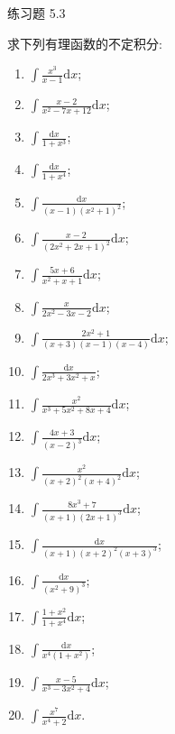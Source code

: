 \begin{exblock}{练习题 5.3}
  \item 求下列有理函数的不定积分:
  \begin{enumerate}[label=(\arabic*)]
    \item $\int\frac{x^{3}}{x-1}\mathrm{d}x$;
    \item $\int\frac{x-2}{x^{2}-7x+12}\mathrm{d}x$;
    \item $\int\frac{\mathrm{d}x}{1+x^{3}}$;
    \item $\int\frac{\mathrm{d}x}{1+x^{4}}$;
    \item $\int\frac{\mathrm{d}x}{(x-1)(x^{2}+1)^{2}}$;
    \item $\int\frac{x-2}{(2x^{2}+2x+1)^{2}}\mathrm{d}x$;
    \item $\int\frac{5x+6}{x^{2}+x+1}\mathrm{d}x$;
    \item $\int\frac{x}{2x^{2}-3x-2}\mathrm{d}x$;
    \item $\int\frac{2x^{2}+1}{(x+3)(x-1)(x-4)}\mathrm{d}x$;
    \item $\int\frac{\mathrm{d}x}{2x^{3}+3x^{2}+x}$;
    \item $\int\frac{x^{2}}{x^{3}+5x^{2}+8x+4}\mathrm{d}x$;
    \item $\int\frac{4x+3}{(x-2)^{3}}\mathrm{d}x$;
    \item $\int\frac{x^{2}}{(x+2)^{2}(x+4)^{2}}\mathrm{d}x$;
    \item $\int\frac{8x^{3}+7}{(x+1)(2x+1)^{3}}\mathrm{d}x$;
    \item $\int\frac{\mathrm{d}x}{(x+1)(x+2)^{2}(x+3)^{3}}$;
    \item $\int\frac{\mathrm{d}x}{(x^{2}+9)^{3}}$;
    \item $\int\frac{1+x^{2}}{1+x^{4}}\mathrm{d}x$;
    \item $\int\frac{\mathrm{d}x}{x^{4}(1+x^{2})}$;
    \item $\int\frac{x-5}{x^{3}-3x^{2}+4}\mathrm{d}x$;
    \item $\int\frac{x^{7}}{x^{4}+2}\mathrm{d}x$.
  \end{enumerate}


\end{exblock}

